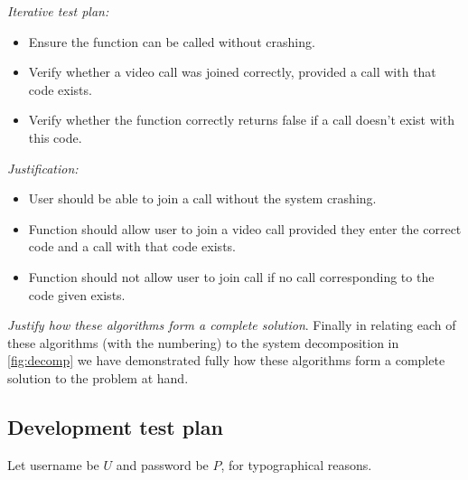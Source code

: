 \textit{Iterative test plan: }  \\

\begin{itemize}

\item{Ensure the function can be called without crashing.}

\item{Verify whether a video call was joined correctly,
provided a call with that code exists.}

\item{Verify whether the function correctly returns false
if a call doesn't exist with this code.}

\end{itemize}

\textit{Justification: } \\

\begin{itemize}

\item User should be able to join a call without the system crashing.

\item{Function should allow user to join a video call provided they
	enter the correct code and a call with that code exists.}

\item Function should not allow user to join call if no call corresponding to the code given exists.

\end{itemize}

\vspace{0.2cm}

\textit{Justify how these algorithms form a complete solution}.
Finally in relating each of these algorithms (with the
numbering) to the system decomposition in \ref{fig:decomp}
we have demonstrated fully how these algorithms form a
complete solution to the problem at hand.

\subsection{Development test plan}

%

Let username be $U$ and password be $P$, for
typographical reasons.



